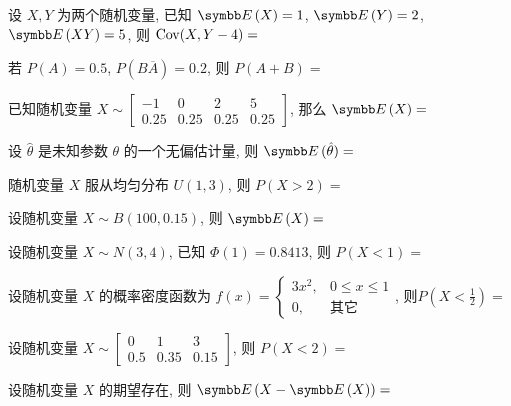 \begin{ti}
	设 $X,Y$ 为两个随机变量, 已知 $\EE(X)=1$, $\EE(Y)=2$, $\EE(XY)=5$, 则 $\operatorname{Cov}(X,Y-4)=$ \hua{}
\end{ti}

\begin{ti}
	若 $P(A)=0.5$, $P\left(B\overline{A}\right)=0.2$, 则 $P(A+B)=$ \hua{}
\end{ti}

\begin{ti}
	已知随机变量 $X\sim
	\begin{bmatrix}
	-1 & 0 & 2 & 5\\
	0.25 & 0.25 & 0.25 & 0.25
	\end{bmatrix}
	$, 那么 $\EE(X)=$ \hua{}
\end{ti}

\begin{ti}
	设 $\hat\theta$ 是未知参数 $\theta$ 的一个无偏估计量, 则 $\EE(\hat\theta)=$ \hua{}
\end{ti}

\begin{ti}
	随机变量 $X$ 服从均匀分布 $U(1,3)$, 则 $P(X>2)=$ \hua{}
\end{ti}

\begin{ti}
	设随机变量 $X\sim B(100,0.15)$, 则 $\EE(X)=$ \hua{}
\end{ti}

\begin{ti}
	设随机变量 $X\sim N(3,4)$, 已知 $\varPhi(1)=0.8413$, 则 $P(X<1)=$ \hua{}
\end{ti}

\begin{ti}
	设随机变量 $X$ 的概率密度函数为 $f(x)=
	\begin{cases}
	3x^2, & 0\leqslant x\leqslant 1\\
	0, & \text{其它}
	\end{cases}
	$, 则$ P\left(X<\frac{1}{2}\right)=$ \hua{}
\end{ti}

\begin{ti}
	设随机变量 $X\sim
	\begin{bmatrix}
	0 & 1 & 3\\
	0.5 & 0.35 & 0.15
	\end{bmatrix}
	$, 则 $P(X<2)=$ \hua{}
\end{ti}

\begin{ti}
	设随机变量 $X$ 的期望存在, 则 $\EE(X-\EE(X))=$ \hua{}
\end{ti}

